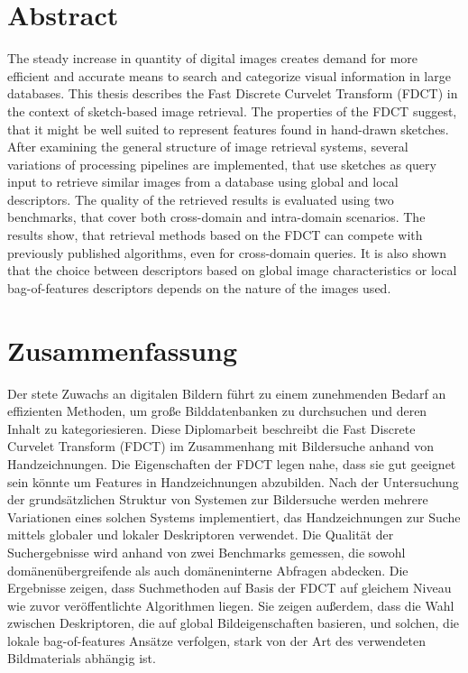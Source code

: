 \begingroup
\let\clearpage\relax
\let\cleardoublepage\relax
\let\cleardoublepage\relax

\chapter*{Abstract}
The steady increase in quantity of digital images creates demand for more
efficient and accurate means to search and categorize visual information in
large databases. This thesis describes the Fast Discrete Curvelet Transform
(FDCT) in the context of sketch-based image retrieval. The properties of the
FDCT suggest, that it might be well suited to represent features found in
hand-drawn sketches. After examining the general structure of image retrieval
systems, several variations of processing pipelines are implemented, that use
sketches as query input to retrieve similar images from a database using global
and local descriptors. The quality of the retrieved results is evaluated using
two benchmarks, that cover both cross-domain and intra-domain scenarios.
The results show, that retrieval methods based on the FDCT can compete with
previously published algorithms, even for cross-domain queries. It is also
shown that the choice between descriptors based on global image characteristics
or local bag-of-features descriptors depends on the nature of the images used.

\vfill

\chapter*{Zusammenfassung}
Der stete Zuwachs an digitalen Bildern führt zu einem zunehmenden Bedarf an
effizienten Methoden, um große Bilddatenbanken zu durchsuchen und deren Inhalt
zu kategoriesieren. Diese Diplomarbeit beschreibt die Fast Discrete Curvelet
Transform (FDCT) im Zusammenhang mit Bildersuche anhand von Handzeichnungen.
Die Eigenschaften der FDCT legen nahe, dass sie gut geeignet sein könnte um
Features in Handzeichnungen abzubilden. Nach der Untersuchung der
grundsätzlichen Struktur von Systemen zur Bildersuche werden mehrere
Variationen eines solchen Systems implementiert, das Handzeichnungen zur Suche
mittels globaler und lokaler Deskriptoren verwendet. Die Qualität der
Suchergebnisse wird anhand von zwei Benchmarks gemessen, die sowohl
domänenübergreifende als auch domäneninterne Abfragen abdecken.
Die Ergebnisse zeigen, dass Suchmethoden auf Basis der FDCT auf gleichem Niveau
wie zuvor veröffentlichte Algorithmen liegen. Sie zeigen außerdem, dass die
Wahl zwischen Deskriptoren, die auf global Bildeigenschaften basieren, und
solchen, die lokale bag-of-features Ansätze verfolgen, stark von der Art des
verwendeten Bildmaterials abhängig ist.

\endgroup			

\vfill
